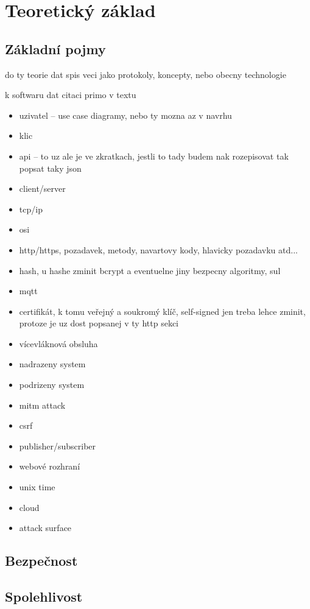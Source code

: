 \chapter{Teoretický základ}
\label{sec:te}

\section{Základní pojmy}

do ty teorie dat spis veci jako protokoly, koncepty, nebo obecny technologie

k softwaru dat citaci primo v textu

\begin{itemize}
    \item uzivatel -- use case diagramy, nebo ty mozna az v navrhu
    \item klic
    \item api -- to uz ale je ve zkratkach, jestli to tady budem nak rozepisovat tak popsat taky json
    \item client/server
    \item tcp/ip
    \item osi
    \item http/https, pozadavek, metody, navartovy kody, hlavicky pozadavku atd...
    \item hash, u hashe zminit bcrypt a eventuelne jiny bezpecny algoritmy, sul
    \item mqtt
    \item certifikát, k tomu veřejný a soukromý klíč, self-signed jen treba lehce zminit, protoze je uz dost popsanej v ty http sekci
    \item vícevláknová obsluha
    \item nadrazeny system
    \item podrizeny system
    \item mitm attack
    \item csrf
    \item publisher/subscriber
    \item webové rozhraní
    \item unix time
    \item cloud
    \item attack surface
\end{itemize}

\section{Bezpečnost}

\section{Spolehlivost}
